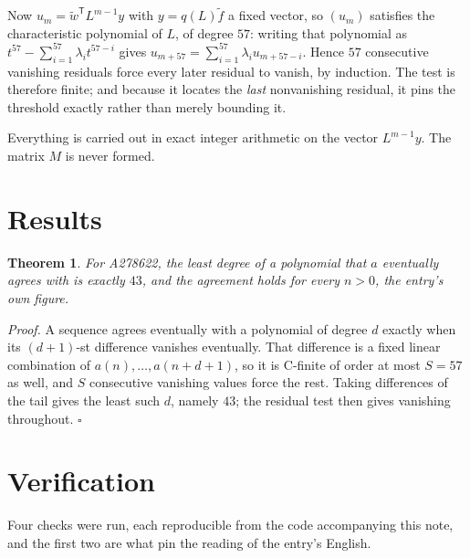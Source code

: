 \documentclass[11pt]{article}
\newtheorem{theorem}{Theorem}
\theoremstyle{definition}
\begin{document}
Now $u_m = \tilde w^{\mathsf T} L^{m-1} y$ with $y = q(L)\tilde f$ a fixed vector, so $(u_m)$ satisfies the characteristic polynomial of $L$, of degree $57$: writing that polynomial as $t^{57} - \sum_{i=1}^{57} \lambda_i t^{57-i}$ gives $u_{m+57} = \sum_{i=1}^{57} \lambda_i u_{m+57-i}$. Hence $57$ consecutive vanishing residuals force every later residual to vanish, by induction. The test is therefore finite; and because it locates the {\itshape last} nonvanishing residual, it pins the threshold exactly rather than merely bounding it.

Everything is carried out in exact integer arithmetic on the vector $L^{m-1}y$. The matrix $M$ is never formed.

\section{Results}

\begin{theorem} For A278622, the least degree of a polynomial that $a$ eventually agrees with is exactly $43$, and the agreement holds for every $n > 0$, the entry's own figure.\end{theorem}

{\itshape Proof.} A sequence agrees eventually with a polynomial of degree $d$ exactly when its $(d+1)$-st difference vanishes eventually. That difference is a fixed linear combination of $a(n),\dots,a(n+d+1)$, so it is C-finite of order at most $S = 57$ as well, and $S$ consecutive vanishing values force the rest. Taking differences of the tail gives the least such $d$, namely $43$; the residual test then gives vanishing throughout. $\square$

\section{Verification}

Four checks were run, each reproducible from the code accompanying this note, and the first two are what pin the reading of the entry's English.
\end{document}
